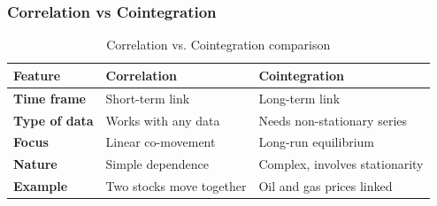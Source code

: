 \begin{frame}[allowframebreaks]
	\frametitle{Correlation vs Cointegration}
	\begin{table}[h!]
		\centering
		\tiny
		\begin{tabular}{lll}
			\toprule
			
			\textbf{Feature} & \textbf{Correlation} & \textbf{Cointegration} \\ 
			
			\midrule
			
			\textbf{Time frame} & Short-term link & Long-term link \\ 
			
			\textbf{Type of data} & Works with any data & Needs non-stationary series \\ 
			
			\textbf{Focus} & Linear co-movement & Long-run equilibrium \\ 
			
			\textbf{Nature} & Simple dependence & Complex, involves stationarity \\ 
			
			\textbf{Example} & Two stocks move together & Oil and gas prices linked \\ 
			
			\bottomrule
		\end{tabular}
		\caption{Correlation vs. Cointegration comparison}
		\label{tab:corr__coint}
	\end{table}
\end{frame}

		
